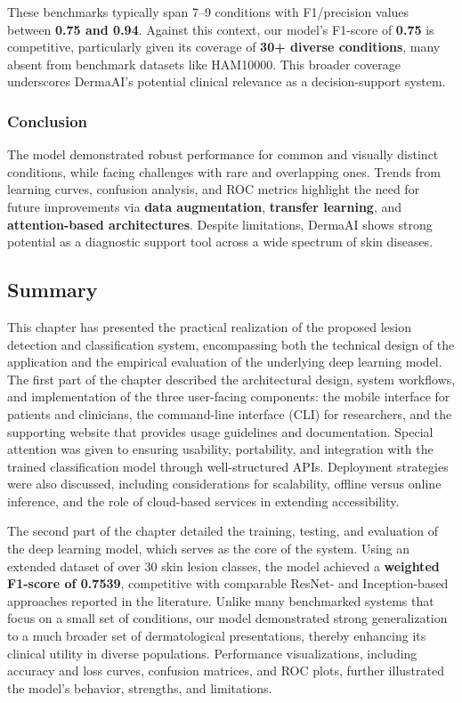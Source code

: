 \documentclass[
  12pt,
  oneside]{article}
\begin{document}
These benchmarks typically span 7--9 conditions with F1/precision values
between \textbf{0.75 and 0.94}. Against this context, our model's
F1-score of \textbf{0.75} is competitive, particularly given its
coverage of \textbf{30+ diverse conditions}, many absent from benchmark
datasets like HAM10000. This broader coverage underscores DermaAI's
potential clinical relevance as a decision-support system.

\subsubsection{Conclusion}\label{conclusion-3}

The model demonstrated robust performance for common and visually
distinct conditions, while facing challenges with rare and overlapping
ones. Trends from learning curves, confusion analysis, and ROC metrics
highlight the need for future improvements via \textbf{data
augmentation}, \textbf{transfer learning}, and \textbf{attention-based
architectures}. Despite limitations, DermaAI shows strong potential as a
diagnostic support tool across a wide spectrum of skin diseases.

\subsection{Summary}\label{summary-2}

This chapter has presented the practical realization of the proposed
lesion detection and classification system, encompassing both the
technical design of the application and the empirical evaluation of the
underlying deep learning model. The first part of the chapter described
the architectural design, system workflows, and implementation of the
three user-facing components: the mobile interface for patients and
clinicians, the command-line interface (CLI) for researchers, and the
supporting website that provides usage guidelines and documentation.
Special attention was given to ensuring usability, portability, and
integration with the trained classification model through
well-structured APIs. Deployment strategies were also discussed,
including considerations for scalability, offline versus online
inference, and the role of cloud-based services in extending
accessibility.

The second part of the chapter detailed the training, testing, and
evaluation of the deep learning model, which serves as the core of the
system. Using an extended dataset of over 30 skin lesion classes, the
model achieved a \textbf{weighted F1-score of 0.7539}, competitive with
comparable ResNet- and Inception-based approaches reported in the
literature. Unlike many benchmarked systems that focus on a small set of
conditions, our model demonstrated strong generalization to a much
broader set of dermatological presentations, thereby enhancing its
clinical utility in diverse populations. Performance visualizations,
including accuracy and loss curves, confusion matrices, and ROC plots,
further illustrated the model's behavior, strengths, and limitations.
\end{document}
